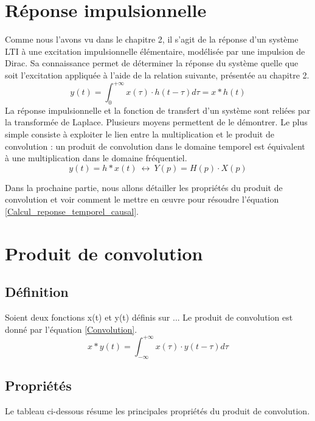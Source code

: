 \documentclass[]{report}
\begin{document}
	\section{Réponse impulsionnelle}
	Comme nous l'avons vu dans le chapitre 2, il s'agit de la réponse d'un système LTI à une excitation impulsionnelle élémentaire, modélisée par une impulsion de Dirac. Sa connaissance permet de déterminer la réponse du système quelle que soit l'excitation appliquée à l'aide de la relation suivante, présentée au chapitre 2.
	\begin{equation}\label{Calcul_reponse_temporel_causal}
	y(t) = \int_{0}^{+ \infty} x(\tau) \cdot h(t-\tau)d\tau = x*h(t)
	\end{equation}
	\vspace{1\baselineskip}
	La réponse impulsionnelle et la fonction de transfert d'un système sont reliées par la transformée de Laplace. Plusieurs moyens permettent de le démontrer. Le plus simple consiste à exploiter le lien entre la multiplication et le produit de convolution : un produit de convolution dans le domaine temporel est équivalent à une multiplication dans le domaine fréquentiel.
	\begin{equation}\label{}
	y(t) =  h*x(t) ~\longleftrightarrow~Y(p)=H(p)\cdot X(p)
	\end{equation}
	
	Dans la prochaine partie, nous allons détailler les propriétés du produit de convolution et voir comment le mettre en œuvre pour résoudre l'équation \ref{Calcul_reponse_temporel_causal}.
	
	\section{Produit de convolution}
	\subsection{Définition}
	Soient deux fonctions x(t) et y(t) définis sur ... Le produit de convolution est donné par l'équation \ref{Convolution}.
	\begin{equation}\label{Convolution}
	x*y(t) = \int_{-\infty}^{+ \infty} x(\tau) \cdot y(t-\tau)d\tau 
	\end{equation}
	
	\subsection{Propriétés}
	Le tableau ci-dessous résume les principales propriétés du produit de convolution.
		
\end{document}
